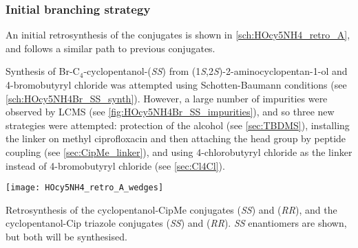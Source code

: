 \subsubsection{Initial branching strategy\label{sec:init_branch}}

An initial retrosynthesis of the conjugates is shown in \ref{sch:HOcy5NH4_retro_A}, and follows a similar path to previous conjugates.

Synthesis of Br-C$_4$-cyclopentanol-(\textit{SS})  from (1\textit{S},2\textit{S})-2-aminocyclopentan-1-ol  and 4-bromobutyryl chloride  was attempted using Schotten-Baumann conditions (see \ref{sch:HOcy5NH4Br_SS_synth}). However, a large number of impurities were observed by LCMS (see \ref{fig:HOcy5NH4Br_SS_impurities}), and so three new strategies were attempted: protection of the alcohol (see \ref{sec:TBDMS}), installing the linker on methyl ciprofloxacin  and then attaching the head group by peptide coupling (see \ref{sec:CipMe_linker}), and using 4-chlorobutyryl chloride  as the linker instead of 4-bromobutyryl chloride  (see \ref{sec:Cl4Cl}).

\begin{scheme}[H]
	\begin{center}
		\texttt{[image: HOcy5NH4\_retro\_A\_wedges]}
		\caption{Retrosynthesis of the cyclopentanol-CipMe conjugates 
		 (\textit{SS}) and 
		 (\textit{RR}),
		and the cyclopentanol-Cip triazole conjugates 
		 (\textit{SS}) and   (\textit{RR}). 
		\textit{SS} enantiomers are shown, but both will be synthesised. \label{sch:HOcy5NH4_retro_A}}
	\end{center}
\end{scheme}




